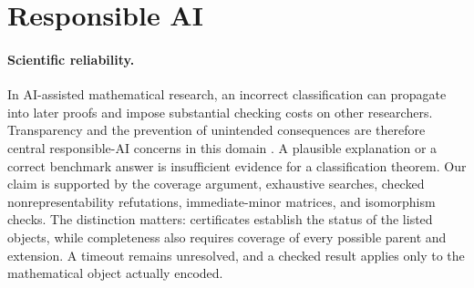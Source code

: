 \documentclass[11pt,letterpaper,titlepage]{article}
\begin{document}

\section{Responsible AI}

\paragraph{Scientific reliability.}
In AI-assisted mathematical research, an incorrect classification can propagate into later proofs and impose substantial checking costs on other researchers. Transparency and the prevention of unintended consequences are therefore central responsible-AI concerns in this domain \cite{responsibleai}. A plausible explanation or a correct benchmark answer is insufficient evidence for a classification theorem. Our claim is supported by the coverage argument, exhaustive searches, checked nonrepresentability refutations, immediate-minor matrices, and isomorphism checks. The distinction matters: certificates establish the status of the listed objects, while completeness also requires coverage of every possible parent and extension. A timeout remains unresolved, and a checked result applies only to the mathematical object actually encoded.
\end{document}
